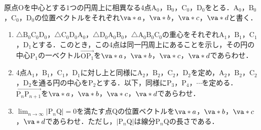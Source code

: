 原点$\mathrm{O}$を中心とする$1$つの円周上に相異なる$4$点$\mathrm{A}_0$，$\mathrm{B}_0$，$\mathrm{C}_0$，$\mathrm{D}_0$をとる．$\mathrm{A}_0$，$\mathrm{B}_0$，$\mathrm{C}_0$，$\mathrm{D}_0$の位置ベクトルをそれぞれ$\va*{a}$，$\va*{b}$，$\va*{c}$，$\va*{d}$と書く．

\begin{enumerate}
  \item $\triangle \mathrm{B_0C_0D_0}$，$\triangle \mathrm{C_0D_0A_0}$，$\triangle \mathrm{D_0A_0B_0}$，$\triangle \mathrm{A_0B_0C_0}$の重心をそれぞれ$\mathrm{A}_1$，$\mathrm{B}_1$，$\mathrm{C}_1$，$\mathrm{D}_1$とする．このとき，この4点は同一円周上にあることを示し，その円の中心$\mathrm{P}_1$の一ベクトル$\overrightarrow{\mathrm{OP_1}}$を$\va*{a}$，$\va*{b}$，$\va*{c}$，$\va*{d}$であらわせ．
  \item 4点$\mathrm{A}_1$，$\mathrm{B}_1$，$\mathrm{C}_1$，$\mathrm{D}_1$に対し上と同様に$\mathrm{A}_2$，$\mathrm{B}_2$，$\mathrm{C}_2$，$\mathrm{D}_2$を定め，$\mathrm{A}_2$，$\mathrm{B}_2$，$\mathrm{C}_2$，$\mathrm{D}_2$を通る円の中心を$\mathrm{P}_2$とする．以下，同様に$\mathrm{P}_3$，$\mathrm{P}_4$，$\cdots$を定める．$\overrightarrow{\mathrm{P}_n\mathrm{P}_{n+1}}$を$\va*{a}$，$\va*{b}$，$\va*{c}$，$\va*{d}$であらわせ．
  \item ${\displaystyle \lim_{n\to\infty} |\mathrm{P}_n\mathrm{Q}|=0}$を満たす点$\mathrm{Q}$の位置ベクトルを$\va*{a}$，$\va*{b}$，$\va*{c}$，$\va*{d}$であらわせ．ただし，$|\mathrm{P}_n\mathrm{Q}|$は線分$\mathrm{P}_n\mathrm{Q}$の長さである．
\end{enumerate}